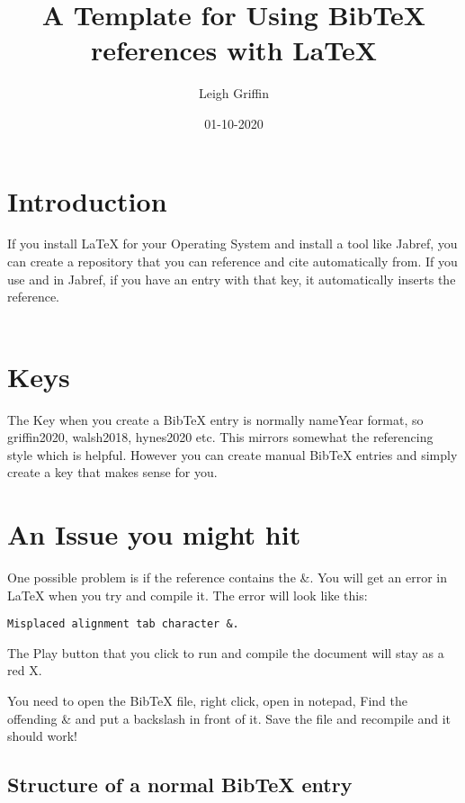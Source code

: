 \documentclass[12pt]{article}
\begin{document}
\title{A Template for Using BibTeX references with LaTeX}
\author{Leigh Griffin}
\date{01-10-2020}

\maketitle


\section{Introduction}
If you install LaTeX for your Operating System and install a tool like Jabref, you can create a repository that you can reference and cite automatically from.
If you use \cite{Sanjay2013} and in Jabref, if you have an entry with that key, it automatically inserts the reference. \\ \\

\section{Keys}

The Key when you create a BibTeX entry is normally nameYear format, so griffin2020, walsh2018, hynes2020 etc. This mirrors somewhat the referencing style which is helpful.
However you can create manual BibTeX entries and simply create a key that makes sense for you.

\section{An Issue you might hit}

One possible problem is if the reference contains the \&. You will get an error in LaTeX when you try and compile it. The error will look like this:

\begin{lstlisting}
Misplaced alignment tab character &.
\end{lstlisting}

The Play button that you click to run and compile the document will stay as a red X.

You need to open the BibTeX file, right click, open in notepad,
Find the offending \& and put a backslash in front of it. Save the file and recompile and it should work!

\subsection{Structure of a normal BibTeX entry}
\end{document}
